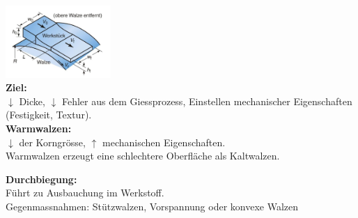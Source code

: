 \includegraphics[width = 40mm]{src/images/Walzen.png}\\
\textbf{Ziel:}\\
$\downarrow$ Dicke, $\downarrow$ Fehler aus dem Giessprozess, Einstellen mechanischer Eigenschaften (Festigkeit, Textur).\\

\textbf{Warmwalzen:}\\
$\downarrow$ der Korngrösse, $\uparrow $ mechanischen Eigenschaften. \\
Warmwalzen erzeugt eine schlechtere Oberfläche als Kaltwalzen.\\
\vfill \null \columnbreak

\textbf{Durchbiegung:}\\
Führt zu Ausbauchung im Werkstoff.\\
Gegenmassnahmen: 
Stützwalzen, Vorspannung oder konvexe Walzen\\
